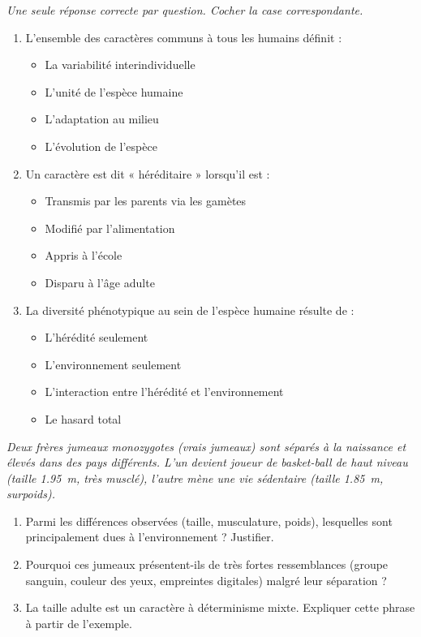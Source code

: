 \documentclass[11pt]{article}
\begin{document}
\begin{exercice}
\emph{Une seule réponse correcte par question. Cocher la case correspondante.}
\begin{enumerate}
    \item L'ensemble des caractères communs à tous les humains définit :
\begin{itemize}
        \item[$\square$] La variabilité interindividuelle
        \item[$\square$] L'unité de l'espèce humaine
        \item[$\square$] L'adaptation au milieu
        \item[$\square$] L'évolution de l'espèce
    \end{itemize}
    \item Un caractère est dit « héréditaire » lorsqu'il est :
\begin{itemize}
        \item[$\square$] Transmis par les parents via les gamètes
        \item[$\square$] Modifié par l'alimentation
        \item[$\square$] Appris à l'école
        \item[$\square$] Disparu à l'âge adulte
    \end{itemize}
    \item La diversité phénotypique au sein de l'espèce humaine résulte de :
\begin{itemize}
        \item[$\square$] L'hérédité seulement
        \item[$\square$] L'environnement seulement
        \item[$\square$] L'interaction entre l'hérédité et l'environnement
        \item[$\square$] Le hasard total
    \end{itemize}
\end{enumerate}
\end{exercice}

\begin{exercice}
\emph{Deux frères jumeaux monozygotes (vrais jumeaux) sont séparés à la naissance et élevés dans des pays différents. L'un devient joueur de basket-ball de haut niveau (taille \SI{1,95}{\meter}, très musclé), l'autre mène une vie sédentaire (taille \SI{1,85}{\meter}, surpoids).}
\begin{enumerate}
    \item Parmi les différences observées (taille, musculature, poids), lesquelles sont principalement dues à l'environnement ? Justifier.
    \item Pourquoi ces jumeaux présentent-ils de très fortes ressemblances (groupe sanguin, couleur des yeux, empreintes digitales) malgré leur séparation ?
    \item La taille adulte est un caractère à déterminisme mixte. Expliquer cette phrase à partir de l'exemple.
\end{enumerate}
\end{exercice}
\end{document}

